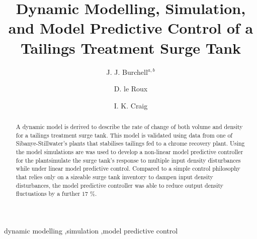 \documentclass[preprint,authoryear,12pt]{elsarticle}
\begin{document}
\begin{frontmatter}



\title{Dynamic Modelling, Simulation, and Model Predictive Control of a Tailings Treatment Surge Tank}


\author{J. J. Burchell$^{a, b}$}
\author[pretoria]{D. le Roux}
\author[pretoria]{I. K. Craig}

\address[sibanye]{Sibanye-Stillwater, Johannesburg, South Africa}
\address[pretoria]{Department of Electrical, Electronic and Computer Engineering, University of Pretoria, Pretoria, South Africa.}

\begin{abstract}
A dynamic model is derived to describe the rate of change of both volume and density for a tailings treatment surge tank. This model is validated using data from one of Sibanye-Stillwater's plants that stabilises tailings fed to a chrome recovery plant. Using the model simulations are was used to develop a non-linear model predictive controller for the plantsimulate the surge tank's response to multiple input density disturbances while under linear model predictive control. Compared to a simple control philosophy that relies only on a sizeable surge tank inventory to dampen input density disturbances, the model predictive controller was able to reduce output density fluctuations by a further $17$ $\%$.
\end{abstract}

\begin{keyword}
dynamic modelling \sep simulation \sep model predictive control


\end{keyword}

\end{frontmatter}
\end{document}
